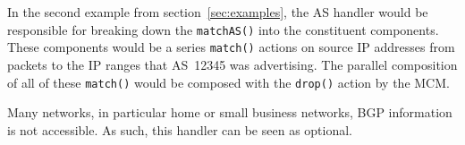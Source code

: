 \documentclass{sig-alternate}
\newcommand\tti[1]{\small\texttt{#1}\normalsize}
\newcommand\system{NetAssay}
\begin{document}
In the second example from section~\ref{sec:examples}, the AS handler would be responsible for breaking down the \tti{match\textunderscore{}AS()} into the constituent components. These components would be a series \tti{match()} actions on source IP addresses from packets to the IP ranges that AS~12345 was advertising. The parallel composition of all of these \tti{match()} would be composed with the \tti{drop()} action by the MCM.


Many networks, in particular home or small business networks, BGP information is not accessible. As such, this handler can be seen as optional.






\end{document}
